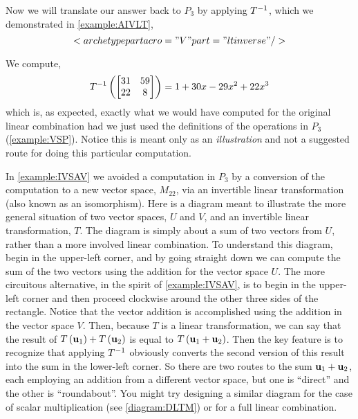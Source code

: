 \documentclass{ximera}
\begin{document}
\begin{example}
Now we will translate our answer back to $P_3$ by applying $T^{-1}$, which we demonstrated in \ref{example:AIVLT},
\[
<archetypepart acro="V" part="ltinverse" />\]




We compute,
\[
T^{-1}\left(
\begin{bmatrix}
31 & 59\\22 & 8
\end{bmatrix}
\right)
=1+30x-29x^2+22x^3
\]
which is, as expected, exactly what we would have computed for the original linear combination had we just used the definitions of the operations in $P_3$ (\ref{example:VSP}).  Notice this is meant only as an \textit{illustration} and not a suggested route for doing this particular computation.



\end{example}

In \ref{example:IVSAV} we avoided a computation in $P_3$ by a conversion of the computation to a new vector space, $M_{22}$, via an invertible linear transformation (also known as an isomorphism).  Here is a diagram meant to illustrate the more general situation of two vector spaces, $U$ and $V$, and an invertible linear transformation, $T$.  The diagram is simply about a sum of two vectors from $U$, rather than a more involved linear combination.
To understand this diagram, begin in the upper-left corner, and by going straight down we can compute the sum of the two vectors using the addition for the vector space $U$.  The more circuitous alternative, in the spirit of \ref{example:IVSAV}, is to begin in the upper-left corner and then proceed clockwise around the other three sides of the rectangle.  Notice that the vector addition is accomplished using the addition in the vector space $V$.  Then, because $T$ is a linear transformation, we can say that the result of $T\left(\mathbf{u}_1\right)+T\left(\mathbf{u}_2\right)$ is  equal to $T\left(\mathbf{u}_1+\mathbf{u}_2\right)$.  Then the key feature is to recognize that applying $T^{-1}$ obviously converts the second version of this result into the sum in the lower-left corner.  So there are two routes to the sum $\mathbf{u}_1+\mathbf{u}_2$, each employing an addition from a different vector space, but one is ``direct'' and the other is ``roundabout''.  You might try designing a similar diagram for the case of scalar multiplication (see \ref{diagram:DLTM}) or for a full linear combination.
\end{document}
